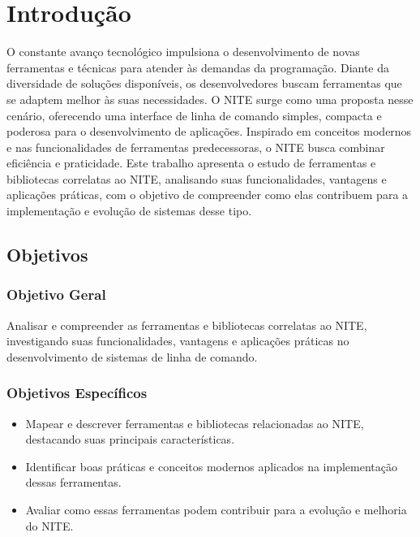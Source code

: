 \chapter{Introdução}
\label{cap:01}

O constante avanço tecnológico impulsiona o desenvolvimento de novas ferramentas e técnicas para atender às demandas da programação. Diante da diversidade de
soluções disponíveis, os desenvolvedores buscam ferramentas que se adaptem melhor às suas necessidades. O NITE surge como uma proposta nesse cenário, oferecendo
uma interface de linha de comando simples, compacta e poderosa para o desenvolvimento de aplicações. Inspirado em conceitos modernos e nas funcionalidades de
ferramentas predecessoras, o NITE busca combinar eficiência e praticidade. Este trabalho apresenta o estudo de ferramentas e bibliotecas correlatas ao NITE,
analisando suas funcionalidades, vantagens e aplicações práticas, com o objetivo de compreender como elas contribuem para a implementação e evolução de
sistemas desse tipo.

\section{Objetivos}

\subsection{Objetivo Geral}

Analisar e compreender as ferramentas e bibliotecas correlatas ao NITE, investigando suas funcionalidades, vantagens e aplicações práticas no desenvolvimento
de sistemas de linha de comando.

\subsection{Objetivos Específicos}
\begin{itemize}
    \item Mapear e descrever ferramentas e bibliotecas relacionadas ao NITE, destacando suas principais características.
    \item Identificar boas práticas e conceitos modernos aplicados na implementação dessas ferramentas.
    \item Avaliar como essas ferramentas podem contribuir para a evolução e melhoria do NITE.
\end{itemize}
